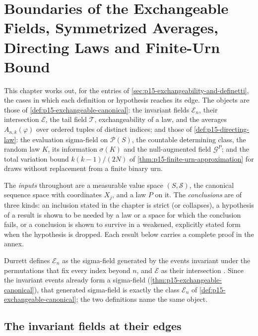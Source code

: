\chapter{Boundaries of the Exchangeable Fields, Symmetrized Averages, Directing Laws and Finite-Urn Bound}
\label{sec:p15-w02c-p15-022}

This chapter works out, for the entries of
\cref{sec:p15-exchangeability-and-definetti}, the cases in which each
definition or hypothesis reaches its edge. The objects are those of
\cref{def:p15-exchangeable-canonical}: the invariant fields
\(\mathcal E_n\), their intersection \(\mathcal E\), the tail field
\(\mathcal T\), exchangeability of a law, and the averages
\(A_{n,k}(\varphi)\) over ordered tuples of distinct indices; and those of
\cref{def:p15-directing-law}: the evaluation sigma-field on
\(\mathscr P(S)\), the countable determining class, the random law
\(K\), its information \(\sigma(K)\) and the null-augmented field
\(\mathcal G^P\); and the total variation bound
\(k(k-1)/(2N)\) of \cref{thm:p15-finite-urn-approximation} for draws
without replacement from a finite binary urn.

The \emph{inputs} throughout are a measurable value space
\((S,\mathcal S)\), the canonical sequence space with coordinates
\(X_j\), and a law \(P\) on it. The \emph{conclusions} are of three kinds:
an inclusion stated in the chapter is strict (or collapses), a
hypothesis of a result is shown to be needed by a law or a space for
which the conclusion fails, or a conclusion is shown to survive in a
weakened, explicitly stated form when the hypothesis is dropped.
Each result below carries a complete proof in the annex.

Durrett defines \(\mathcal E_n\) as the sigma-field generated by the
events invariant under the permutations that fix every index beyond
\(n\), and \(\mathcal E\) as their intersection
\cite[p.~250]{DurrettPTEAuthor2019}. Since the invariant events already
form a sigma-field (\cref{thm:p15-exchangeable-canonical}), that
generated sigma-field is exactly the class \(\mathcal E_n\) of
\cref{def:p15-exchangeable-canonical}; the two definitions name the same
object.

\section{The invariant fields at their edges}
\label{sec:p15-w02c-p15-022-fields}

